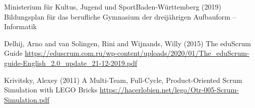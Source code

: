 \documentclass[twoside,twocolumn]{article}
\begin{document}

\begin{thebibliography}{99} %

Ministerium für Kultus, Jugend und SportBaden-Württemberg (2019)
\newblock Bildungsplan für das berufliche Gymnasium der dreijährigen Aufbauform -- Informatik

Delhij, Arno and van Solingen, Rini and Wijnands, Willy (2015)
\newblock The eduScrum Guide
\newblock \url{https://eduscrum.com.ru/wp-content/uploads/2020/01/The_eduScrum-guide-English_2.0_update_21-12-2019.pdf}

  Krivitsky, Alexey (2011)
  \newblock A Multi-Team, Full-Cycle, Product-Oriented Scrum Simulation with LEGO Bricks
  \newblock \url{https://hacerlobien.net/lego/Otr-005-Scrum-Simulation.pdf}

\end{thebibliography}

\end{document}
